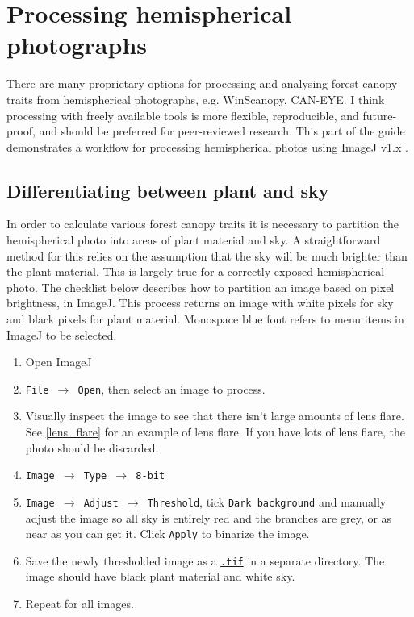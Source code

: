 \documentclass{article}
\newcommand\menu[1]{\texttt{\color{blue}#1}}
\newcommand\file[1]{\texttt{\underline{#1}}}
\begin{document}
\section{Processing hemispherical photographs}

There are many proprietary options for processing and analysing forest canopy traits from hemispherical photographs, e.g. WinScanopy, CAN-EYE. I think processing with freely available tools is more flexible, reproducible, and future-proof, and should be preferred for peer-reviewed research. This part of the guide demonstrates a workflow for processing hemispherical photos using ImageJ v1.x \citep{Schneider2012}.

\subsection{Differentiating between plant and sky}

In order to calculate various forest canopy traits it is necessary to partition the hemispherical photo into areas of plant material and sky. A straightforward method for this relies on the assumption that the sky will be much brighter than the plant material. This is largely true for a correctly exposed hemispherical photo. The checklist below describes how to partition an image based on pixel brightness, in ImageJ. This process returns an image with white pixels for sky and black pixels for plant material. Monospace blue font refers to menu items in ImageJ to be selected.

\begin{enumerate}
	\item{Open ImageJ}
	\item{\menu{File $\rightarrow$ Open}, then select an image to process.}
	\item{Visually inspect the image to see that there isn't large amounts of lens flare. See \autoref{lens_flare} for an example of lens flare. If you have lots of lens flare, the photo should be discarded.}
	\item{\menu{Image $\rightarrow$ Type $\rightarrow$ 8-bit}}
	\item{\menu{Image $\rightarrow$ Adjust $\rightarrow$ Threshold}, tick \menu{Dark background} and manually adjust the image so all sky is entirely red and the branches are grey, or as near as you can get it. Click \menu{Apply} to binarize the image.}
	\item{Save the newly thresholded image as a \file{.tif} in a separate directory. The image should have black plant material and white sky.}
	\item{Repeat for all images.}
\end{enumerate}
\end{document}
